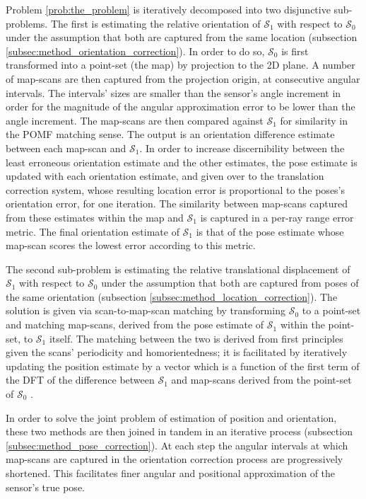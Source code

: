 Problem \ref{prob:the_problem} is iteratively decomposed into two disjunctive
sub-problems. The first is estimating the relative orientation of
$\mathcal{S}_1$ with respect to $\mathcal{S}_0$ under the assumption that both
are captured from the same location (subsection
\ref{subsec:method_orientation_correction}). In order to do so, $\mathcal{S}_0$ is
first transformed into a point-set (the map) by projection to the 2D plane. A
number of map-scans are then captured from the projection origin, at
consecutive angular intervals. The intervals' sizes are smaller than the
sensor's angle increment in order for the magnitude of the angular
approximation error to be lower than the angle increment.  The map-scans are
then compared against $\mathcal{S}_1$ for similarity in the POMF matching
sense. The output is an orientation difference estimate between each map-scan
and $\mathcal{S}_1$. In order to increase discernibility between the least
erroneous orientation estimate and the other estimates, the pose estimate is
updated with each orientation estimate, and given over to the translation
correction system, whose resulting location error is proportional to the
poses's orientation error, for one iteration. The similarity between map-scans
captured from these estimates within the map and $\mathcal{S}_1$ is captured in
a per-ray range error metric. The final orientation estimate of $\mathcal{S}_1$
is that of the pose estimate whose map-scan scores the lowest error according
to this metric.

The second sub-problem is estimating the relative translational displacement of
$\mathcal{S}_1$ with respect to $\mathcal{S}_0$ under the assumption that both
are captured from poses of the same orientation (subsection
\ref{subsec:method_location_correction}). The solution is given via
scan-to-map-scan matching by transforming $\mathcal{S}_0$ to a point-set and
matching map-scans, derived from the pose estimate of $\mathcal{S}_1$ within
the point-set, to $\mathcal{S}_1$ itself. The matching between the two is
derived from first principles given the scans' periodicity and homorientedness;
it is facilitated by iteratively updating the position estimate by a vector
which is a function of the first term of the DFT of the difference between
$\mathcal{S}_1$ and map-scans derived from the point-set of $\mathcal{S}_0$
\cite{Filotheou2022}.

In order to solve the joint problem of estimation of position and orientation,
these two methods are then joined in tandem in an iterative process (subsection
\ref{subsec:method_pose_correction}). At each step the angular intervals at
which map-scans are captured in the orientation correction process are
progressively shortened. This facilitates finer angular and positional
approximation of the sensor's true pose.

